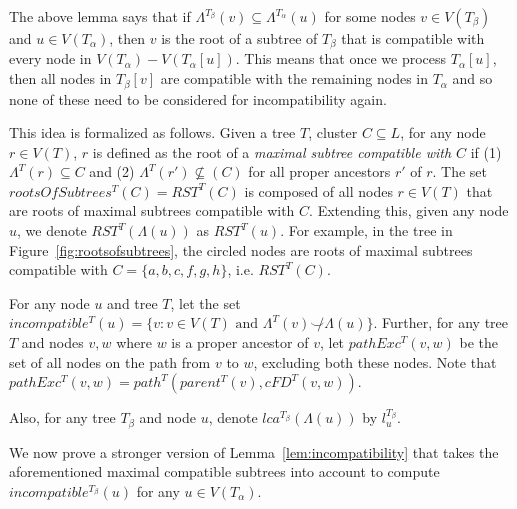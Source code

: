 \documentclass{article}
\newcommand{\compatible}{\smile}
\newcommand{\leafset}{\Lambda}
\newcommand{\TA}{T_\alpha}
\newcommand{\TB}{T_\beta}
\begin{document}
    The above lemma says that if $\leafset^{\TB}(v) \subseteq \leafset^{\TA}(u)$ for some nodes $v \in V(\TB)$ and $u \in V(\TA)$, then $v$ is the root of a subtree of $\TB$ that is compatible with every node in $V(\TA) - V(\TA[u])$. This means that once we process $\TA[u]$, then all nodes in $\TB[v]$ are compatible with the remaining nodes in $\TA$ and so none of these need to be considered for incompatibility again.

    This idea is formalized as follows. Given a tree $T$, cluster $C \subseteq L$, for any node $r \in V(T)$, $r$ is defined as the root of a \textit{maximal subtree compatible with $C$} if (1) $\leafset^T(r) \subseteq C$ and (2) $\leafset^T(r') \not\subseteq(C)$ for all proper ancestors $r'$ of $r$. The set $rootsOfSubtrees^{T}(C) = RST^{T}(C)$ is composed of all nodes $r \in V(T)$ that are roots of maximal subtrees compatible with $C$. Extending this, given any node $u$, we denote $RST^{T}(\leafset(u))$ as $RST^{T}(u)$. For example, in the tree in Figure~\ref{fig:rootsofsubtrees}, the circled nodes are roots of maximal subtrees compatible with $C = \{a, b, c, f, g, h\}$, i.e. $RST^{T}(C)$.

    For any node $u$ and tree $T$, let the set $incompatible^T(u) = \{v : v \in V(T) \text{ and } \leafset^T(v) \not\compatible \leafset(u)\}$. Further, for any tree $T$ and nodes $v, w$ where $w$ is a proper ancestor of $v$, let $pathExc^T(v, w)$ be the set of all nodes on the path from $v$ to $w$, excluding both these nodes. Note that $pathExc^T(v, w) = path^T(parent^T(v), cFD^T(v, w))$.

    Also, for any tree $\TB$ and node $u$, denote $lca^{\TB}(\leafset(u))$ by $l_u^{\TB}$.

    We now prove a stronger version of Lemma~\ref{lem:incompatibility} that takes the aforementioned maximal compatible subtrees into account to compute $incompatible^{\TB}(u)$ for any $u \in V(\TA)$.
    \newline
\end{document}
